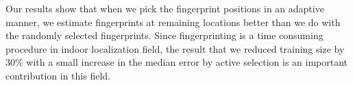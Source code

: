 \documentclass{article}
\begin{document}
	Our results show that when we pick the fingerprint positions in an adaptive manner, we estimate fingerprints at remaining locations better than we do with the randomly selected fingerprints. Since fingerprinting is a time consuming procedure in indoor localization field, the result that we reduced training size by $30\%$ with a small increase in the median error by active selection is an important contribution in this field.
	
	\vfill\pagebreak
	
	
	
	
	
\end{document}
